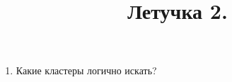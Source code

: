 \documentclass[12pt] {article}
\title{Летучка 2.}
\begin{document}
\clearpage
\thispagestyle{empty}
\begin{enumerate}
\item Какие кластеры логично искать?
\end{enumerate}
\end{document}
